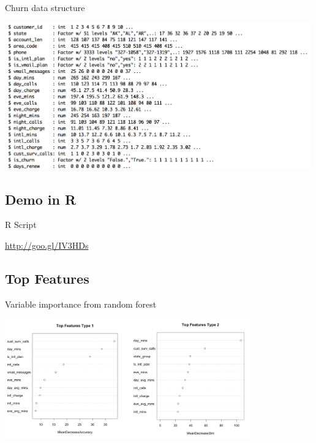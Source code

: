 \documentclass[10pt]{beamer}
\begin{document}
    \begin{frame}{Churn data structure}
      \begin{center}
        \includegraphics[height=180pt]{../graphs/dataset_churn_str}
      \end{center}
    \end{frame}

  \subsection{Demo in R}

    \begin{frame}{R Script}
        \begin{center}
          {\large \url{http://goo.gl/IV3HDs}}
        \end{center}
    \end{frame}
    
  \subsection{Top Features}
  
    \begin{frame}{Variable importance from random forest}
        \begin{center}
          \includegraphics[width=300pt]{../graphs/rf_var_importance}
        \end{center}
    \end{frame}
\end{document}
